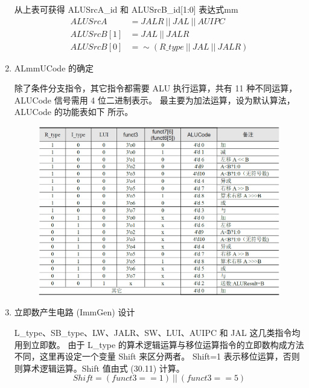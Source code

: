 \documentclass[12pt,hyperref,a4paper,UTF8]{ctexart}
\begin{document}
\begin{enumerate}
    从上表可获得 ALUSrcA\_id 和 ALUSrcB\_id[1:0] 表达式mm
    \begin{align}
    ALUSrcA &= JALR \ || \ JAL \ || \ AUIPC  \\
    ALUSrcB[1] &= JAL \ || \ JALR  \\
    ALUSrcB[0] &=  \sim(R\_type \ || \ JAL \ || \ JALR)
    \end{align}

    \item ALmmUCode 的确定
    
    除了条件分支指令，其它指令都需要 ALU 执行运算，共有 11 种不同运算，ALUCode 信号需用 4 位二进制表示。
    最主要为加法运算，设为默认算法，ALUCode 的功能表如下 所示。
    \begin{figure}[H]
        \centering
        \includegraphics[width=1\textwidth]{figures/fig/image3.png}
    \end{figure}

   \item 立即数产生电路 (ImmGen) 设计
   
    L\_type、SB\_type、LW、JALR、SW、LUI、AUIPC 和 JAL 这几类指令均用到立即数。
    由于 L\_type 的算术逻辑运算与移位运算指令的立即数构成方法不同，这里再设定一个变量 Shift 来区分两者。
    Shift=1 表示移位运算，否则则算术逻辑运算。Shift 值由式 (30.11) 计算。
    \begin{equation}
    Shift=(funct3==1) \ || \ (funct3==5)
    \end{equation}


\end{enumerate}
\end{document}
